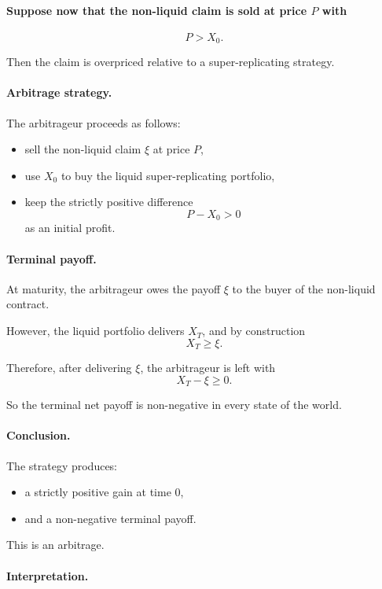\documentclass[11pt]{article}
\newcommand{\1}{\mathbf{1}}
\theoremstyle{plain}
\theoremstyle{definition}
\theoremstyle{remark}
\begin{document}
\paragraph{Suppose now that the non-liquid claim is sold at price \(P\) with}
\[
P > X_0.
\]

Then the claim is overpriced relative to a super-replicating strategy.

\paragraph{Arbitrage strategy.}

The arbitrageur proceeds as follows:
\begin{itemize}[leftmargin=1.4em]
    \item sell the non-liquid claim \(\xi\) at price \(P\),
    \item use \(X_0\) to buy the liquid super-replicating portfolio,
    \item keep the strictly positive difference
    \[
    P-X_0 > 0
    \]
    as an initial profit.
\end{itemize}

\paragraph{Terminal payoff.}

At maturity, the arbitrageur owes the payoff \(\xi\) to the buyer of the
non-liquid contract.

However, the liquid portfolio delivers \(X_T\), and by construction
\[
X_T \ge \xi.
\]

Therefore, after delivering \(\xi\), the arbitrageur is left with
\[
X_T-\xi \ge 0.
\]

So the terminal net payoff is non-negative in every state of the world.

\paragraph{Conclusion.}

The strategy produces:
\begin{itemize}[leftmargin=1.4em]
    \item a strictly positive gain at time \(0\),
    \item and a non-negative terminal payoff.
\end{itemize}

This is an arbitrage.

\paragraph{Interpretation.}
\end{document}
